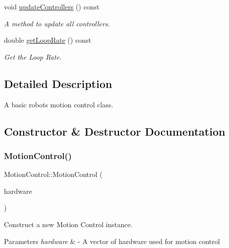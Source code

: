 \begin{DoxyCompactItemize}
\mbox{\label{classMotionControl_a64d6dfbced6ac7e8bed6147d9b7c84d5}} 
void \hyperlink{classMotionControl_a64d6dfbced6ac7e8bed6147d9b7c84d5}{update\+Controllers} () const
\begin{DoxyCompactList}\small\item\em A method to update all controllers. \end{DoxyCompactList}\item 
double \hyperlink{classMotionControl_aa54a9d8ce253dce201af950a2d7c12b5}{get\+Loop\+Rate} () const
\begin{DoxyCompactList}\small\item\em Get the Loop Rate. \end{DoxyCompactList}\end{DoxyCompactItemize}


\subsection{Detailed Description}
A basic robot\textquotesingle{}s motion control class. 

\subsection{Constructor \& Destructor Documentation}
\mbox{\label{classMotionControl_ae8bab933ae11e44d888de44d76b246b3}} 
\subsubsection{\texorpdfstring{Motion\+Control()}{MotionControl()}\hspace{0.1cm}{\footnotesize\ttfamily [1/2]}}
{\footnotesize\ttfamily Motion\+Control\+::\+Motion\+Control (\begin{DoxyParamCaption}\item[{const std\+::vector$<$ \hyperlink{classBasicRobotHW}{Basic\+Robot\+HW} $\ast$$>$ \&}]{hardware }\end{DoxyParamCaption})\hspace{0.3cm}{\ttfamily [explicit]}}



Construct a new Motion Control instance. 


\begin{DoxyParams}{Parameters}
{\em hardware} & -\/ A vector of hardware used for motion control \\
\hline
\end{DoxyParams}
\mbox{\label{classMotionControl_ae3e70e9d88085d3b0dd023fd29b62613}} 
